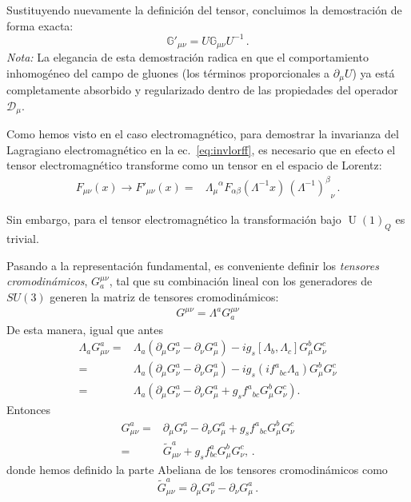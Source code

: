 \begin{frame}
Sustituyendo nuevamente la definición del tensor, concluimos la demostración de forma exacta:
\begin{equation}
    \mathbb{G}'_{\mu\nu} = U \mathbb{G}_{\mu\nu} U^{-1} \, .
\end{equation}
\textit{Nota:} La elegancia de esta demostración radica en que el comportamiento inhomogéneo del campo de gluones (los términos proporcionales a $\partial_\mu U$) ya está completamente absorbido y regularizado dentro de las propiedades del operador $\mathcal{D}_\mu$.
\end{frame}



Como hemos visto en el caso electromagnético, para demostrar la invarianza del Lagragiano electromagnético en la ec.~\eqref{eq:invlorff}, es necesario que en efecto el tensor electromagnético transforme como un tensor en el espacio de Lorentz:
\begin{align}
  F_{\mu\nu}(x) \to F'_{\mu\nu}(x)  =& { \Lambda_{\mu}}^{\alpha}F_{\alpha\beta}\left( \Lambda^{-1}x \right)\,
                   {\left( \Lambda^{-1} \right)^{\beta}}_{\nu} \,.
\end{align}


Sin embargo, para el tensor electromagnético la transformación bajo $\operatorname{U}(1)_Q$ es trivial.



\begin{frame}
Pasando a la representación fundamental, es conveniente definir los \emph{tensores cromodinámicos}, $G^{\mu\nu}_a$, tal que su combinación lineal con los generadores de $SU(3)$ generen la matriz de tensores cromodinámicos:
\begin{align}
\label{eq:Gmunu}
{G}^{\mu\nu}={\Lambda}^aG^{\mu\nu}_a
\end{align}
De esta manera, igual que antes
\begin{align}
  {\Lambda}_a G_{\mu\nu}^a=& {\Lambda}_a
\left( \partial_{\mu}G_{\nu}^{a}-\partial_{\nu}G_{\mu}^{a}  \right)
-i g_s \left[ {\Lambda}_b,{\Lambda}_c \right]G_{\mu}^{b}G_{\nu}^{c} \nonumber\\
=&{\Lambda}_a
\left( \partial_{\mu}G_{\nu}^{a}-\partial_{\nu}G_{\mu}^{a}  \right)
-i g_s \left(i {f^{a}}_{bc} {\Lambda}_a \right)G_{\mu}^{b}G_{\nu}^{c} \nonumber\\
=&{\Lambda}_a \left(  \partial_{\mu}G_{\nu}^{a}-\partial_{\nu}G_{\mu}^{a} 
+g_s  {f^{a}}_{bc} G_{\mu}^{b}G_{\nu}^{c}\right).
\end{align}
Entonces
\begin{align}
  \label{eq:258qft}
  G_{\mu\nu}^a=&\partial_{\mu}G_{\nu}^{a}-\partial_{\nu}G_{\mu}^{a}+
g_s{f^{a}}_{bc}G_{\mu}^{b}G_{\nu}^{c} \nonumber\\
=&\widetilde{G}_{\mu\nu}^a+g_s f^a_{bc}G_\mu^b G_\nu^c,\,.
\end{align}
donde hemos definido la parte Abeliana de los tensores cromodinámicos como
\begin{equation}
  \widetilde{G}_{\mu\nu}^a=\partial_\mu G_\nu^a-\partial_\nu G_\mu^a\,.
\end{equation}
\end{frame}


